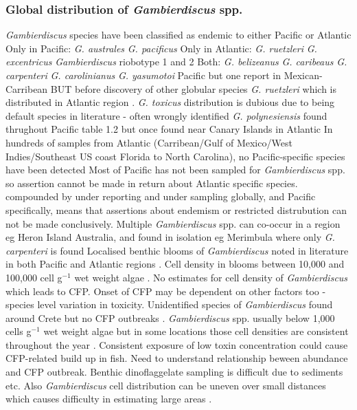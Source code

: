 \subsubsection{Global distribution of \emph{Gambierdiscus} spp.}
\emph{Gambierdiscus} species have been classified as endemic to either Pacific or Atlantic \cite{berdalet2012global,litaker2010global}
Only in Pacific: \emph{G. australes} \emph{G. pacificus} %
Only in Atlantic: \emph{G. ruetzleri} \emph{G. excentricus} \emph{Gambierdiscus} riobotype 1 and 2 %
Both: \emph{G. belizeanus} \emph{G. caribeaus} \emph{G. carpenteri} \emph{G. carolinianus} \cite{litaker2010global,litaker2009taxonomy,berdalet2012global}
\emph{G. yasumotoi} Pacific but one report in Mexican-Carribean \cite{hernandez2004species} BUT before discovery of other globular species \emph{G. ruetzleri} which is distributed in Atlantic region \cite{litaker2009taxonomy}.
\emph{G. toxicus} distribution is dubious due to being default species in literature - often wrongly identified 
\emph{G. polynesiensis} found thrughout Pacific table 1.2 but once found near Canary Islands in Atlantic \cite{fraga2011gambierdiscus}
In hundreds of samples from Atlantic (Carribean/Gulf of Mexico/West Indies/Southeast US coast Florida to North Carolina), no Pacific-specific species have been detected \cite{berdalet2012global,litaker2010global}
Most of Pacific has not been sampled for \emph{Gambierdiscus} spp. so assertion cannot be made in return about Atlantic specific species.
compounded by under reporting and under sampling globally, and Pacific specifically, means that assertions about endemism or restricted distrubution can not be made conclusively.
Multiple \emph{Gambierdiscus} spp. can co-occur in a region eg Heron Island Australia, and found in isolation eg Merimbula where only \emph{G. carpenteri} is found %
Localised benthic blooms of \emph{Gambierdiscus} noted in literature in both Pacific and Atlantic regions \cite{nakajima1981toxicity,withers1984ciguatera,chinain1999seasonal,darius2007ciguatera}.
Cell density in blooms between 10,000 and 100,000 cell g$^{-1}$ wet weight algae \cite{litaker2010global}. No estimates for cell density of \emph{Gambierdiscus} which leads to CFP. Onset of CFP may be dependent on other factors too - species level variation in toxicity. Unidentified species of \emph{Gambierdiscus} found around Crete but no CFP outbreaks \cite{caillaud2010update}.
\emph{Gambierdiscus} spp. usually below 1,000 cells g$^{-1}$ wet weight algae \cite{litaker2010global} but in some locations those cell densities are consistent throughout the year \cite{chinain1999seasonal}.
Consistent exposure of low toxin concentration could cause CFP-related build up in fish. Need to understand relationship beween abundance and CFP outbreak. Benthic dinoflaggelate sampling is difficult due to sediments etc. Also \emph{Gambierdiscus} cell distribution can be uneven over small distances which causes difficulty in estimating large areas \cite{lobel1988assessment,ballantine1988population,litaker2010global}.

